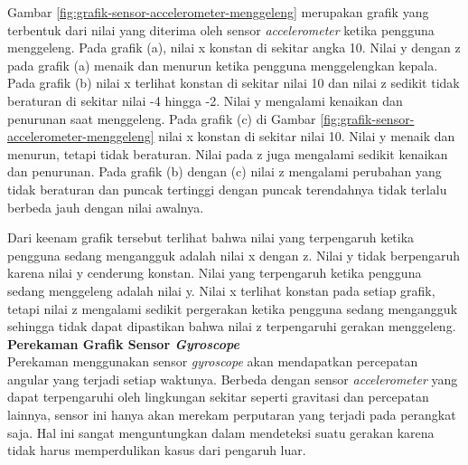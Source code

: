 \documentclass[a4paper,twoside]{article}
\begin{document}
\begin{enumerate}
Gambar \ref{fig:grafik-sensor-accelerometer-menggeleng} merupakan grafik yang terbentuk dari nilai yang diterima oleh sensor \textit{accelerometer} ketika pengguna menggeleng. Pada grafik (a), nilai x konstan di sekitar angka 10. Nilai y dengan z pada grafik (a) menaik dan menurun ketika pengguna menggelengkan kepala. Pada grafik (b) nilai x terlihat konstan di sekitar nilai 10 dan nilai z sedikit tidak beraturan di sekitar nilai -4 hingga -2. Nilai y mengalami kenaikan dan penurunan saat menggeleng. Pada grafik (c) di Gambar \ref{fig:grafik-sensor-accelerometer-menggeleng} nilai x konstan di sekitar nilai 10. Nilai y menaik dan menurun, tetapi tidak beraturan. Nilai pada z juga mengalami sedikit kenaikan dan penurunan. Pada grafik (b) dengan (c) nilai z mengalami perubahan yang tidak beraturan dan puncak tertinggi dengan puncak terendahnya tidak terlalu berbeda jauh dengan nilai awalnya.

Dari keenam grafik tersebut terlihat bahwa nilai yang terpengaruh ketika pengguna sedang mengangguk adalah nilai x dengan z. Nilai y tidak berpengaruh karena nilai y cenderung konstan. Nilai yang terpengaruh ketika pengguna sedang menggeleng adalah nilai y. Nilai x terlihat konstan pada setiap grafik, tetapi nilai z mengalami sedikit pergerakan ketika pengguna sedang mengangguk sehingga tidak dapat dipastikan bahwa nilai z terpengaruhi gerakan menggeleng. \\

\textbf{Perekaman Grafik Sensor \textit{Gyroscope}}\\

\label{sec:analisis_grafik_sensor_gyroscope}
Perekaman menggunakan sensor \textit{gyroscope} akan mendapatkan percepatan angular yang terjadi setiap waktunya. Berbeda dengan sensor \textit{accelerometer} yang dapat terpengaruhi oleh lingkungan sekitar seperti gravitasi dan percepatan lainnya, sensor ini hanya akan merekam perputaran yang terjadi pada perangkat saja. Hal ini sangat menguntungkan dalam mendeteksi suatu gerakan karena tidak harus memperdulikan kasus dari pengaruh luar. 



\end{enumerate}
\end{document}
